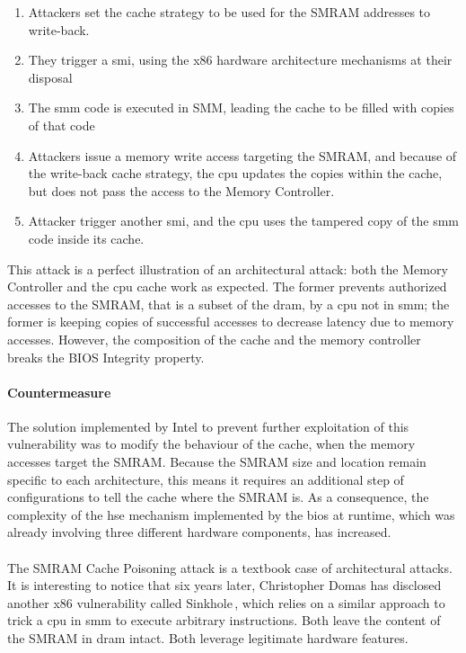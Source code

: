 \begin{enumerate}
\item Attackers set the cache strategy to be used for the SMRAM addresses to
  write-back.

%
\item They trigger a \ac{smi}, using the x86 hardware architecture mechanisms at
  their disposal
%
\item The \ac{smm} code is executed in SMM, leading the cache to be filled with
  copies of that code
%
\item Attackers issue a memory write access targeting the SMRAM, and because of
  the write-back cache strategy, the \ac{cpu} updates the copies within the
  cache, but does not pass the access to the Memory Controller.
%
\item Attacker trigger another \ac{smi}, and the \ac{cpu} uses the tampered copy
  of the \ac{smm} code inside its cache.
\end{enumerate}
%
This attack is a perfect illustration of an architectural attack:
%
both the Memory Controller and the \ac{cpu} cache work as expected.
%
The former prevents authorized accesses to the SMRAM, that is a subset of the
\ac{dram}, by a \ac{cpu} not in \ac{smm};
%
the former is keeping copies of successful accesses to decrease latency due to
memory accesses.
%
However, the composition of the cache and the memory controller breaks the BIOS
Integrity property.

\paragraph{Countermeasure}
%
The solution implemented by Intel to prevent further exploitation of this
vulnerability was to modify the behaviour of the cache, when the memory accesses
target the SMRAM.
%
Because the SMRAM size and location remain specific to each architecture, this
means it requires an additional step of configurations to tell the cache where
the SMRAM is.
%
As a consequence, the complexity of the \ac{hse} mechanism implemented by the
\ac{bios} at runtime, which was already involving three different hardware
components, has increased.

\paragraph{}
%
The SMRAM Cache Poisoning attack is a textbook case of architectural attacks.
%
It is interesting to notice that six years later, Christopher Domas has
disclosed another x86 vulnerability called Sinkhole\,\cite{domas2015sinkhole},
which relies on a similar approach to trick a \ac{cpu} in \ac{smm} to execute
arbitrary instructions.
%
Both leave the content of the SMRAM in \ac{dram} intact.
%
Both leverage legitimate hardware features.


